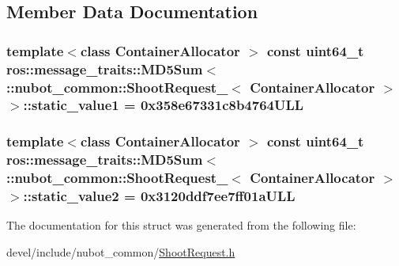 \subsection{Member Data Documentation}
\hypertarget{structros_1_1message__traits_1_1MD5Sum_3_01_1_1nubot__common_1_1ShootRequest___3_01ContainerAllocator_01_4_01_4_aff1848cc43b0ea7294de9e3916056f8e}{
\subsubsection[{static\-\_\-value1}]{\setlength{\rightskip}{0pt plus 5cm}template$<$class Container\-Allocator $>$ const uint64\-\_\-t ros\-::message\-\_\-traits\-::\-M\-D5\-Sum$<$ \-::{\bf nubot\-\_\-common\-::\-Shoot\-Request\-\_\-}$<$ Container\-Allocator $>$ $>$\-::static\-\_\-value1 = 0x358e67331c8b4764\-U\-L\-L\hspace{0.3cm}{\ttfamily [static]}}}\label{structros_1_1message__traits_1_1MD5Sum_3_01_1_1nubot__common_1_1ShootRequest___3_01ContainerAllocator_01_4_01_4_aff1848cc43b0ea7294de9e3916056f8e}
\hypertarget{structros_1_1message__traits_1_1MD5Sum_3_01_1_1nubot__common_1_1ShootRequest___3_01ContainerAllocator_01_4_01_4_a83668cd50304ae0cd7e14657b7a2adb4}{
\subsubsection[{static\-\_\-value2}]{\setlength{\rightskip}{0pt plus 5cm}template$<$class Container\-Allocator $>$ const uint64\-\_\-t ros\-::message\-\_\-traits\-::\-M\-D5\-Sum$<$ \-::{\bf nubot\-\_\-common\-::\-Shoot\-Request\-\_\-}$<$ Container\-Allocator $>$ $>$\-::static\-\_\-value2 = 0x3120ddf7ee7ff01a\-U\-L\-L\hspace{0.3cm}{\ttfamily [static]}}}\label{structros_1_1message__traits_1_1MD5Sum_3_01_1_1nubot__common_1_1ShootRequest___3_01ContainerAllocator_01_4_01_4_a83668cd50304ae0cd7e14657b7a2adb4}


The documentation for this struct was generated from the following file\-:\begin{DoxyCompactItemize}
\item 
devel/include/nubot\-\_\-common/\hyperlink{ShootRequest_8h}{Shoot\-Request.\-h}\end{DoxyCompactItemize}
